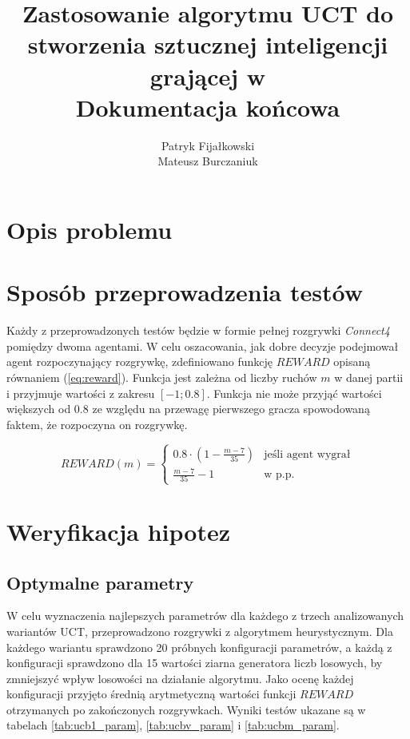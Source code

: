 \documentclass[a4paper,12pt]{article}
\title{
	Zastosowanie algorytmu UCT do stworzenia sztucznej inteligencji grającej w \nazwagry\\
	\large Dokumentacja końcowa}
\author{Patryk Fijałkowski \\ Mateusz Burczaniuk}
\let\oldsection\section
\renewcommand\section{\clearpage\oldsection}
\newcommand{\twopartdef}[3]
{
	\left\{
	\begin{array}{ll}
		#1 & \mbox{jeśli agent wygrał} #2 \\
		#3 & \mbox{w p.p. } 
	\end{array}
	\right.
}
\begin{document}
\begin{titlingpage}
	\maketitle
	\vspace{3cm}
\end{titlingpage}

\section{Opis problemu}


\section{Sposób przeprowadzenia testów}
Każdy z przeprowadzonych testów będzie w formie pełnej rozgrywki \textit{Connect4} pomiędzy dwoma agentami. W celu oszacowania, jak dobre decyzje podejmował agent rozpoczynający rozgrywkę, zdefiniowano funkcję $REWARD$ opisaną równaniem (\ref{eq:reward}). Funkcja jest zależna od liczby ruchów $m$ w danej partii i przyjmuje wartości z zakresu $[-1; 0.8]$. Funkcja nie może przyjąć wartości większych od $0.8$ ze względu na przewagę pierwszego gracza spowodowaną faktem, że rozpoczyna on rozgrywkę.

\begin{equation} \label{eq:reward}
	REWARD(m) = \twopartdef { 0.8 \cdot (1 - \frac{m-7}{35}) } {} {\frac{m-7}{35} - 1}
\end{equation}



\section{Weryfikacja hipotez}
\subsection{Optymalne parametry}
W celu wyznaczenia najlepszych parametrów dla każdego z trzech analizowanych wariantów UCT, przeprowadzono rozgrywki z algorytmem heurystycznym. Dla każdego wariantu sprawdzono 20 próbnych konfiguracji parametrów, a każdą z konfiguracji sprawdzono dla 15 wartości ziarna generatora liczb losowych, by zmniejszyć wpływ losowości na działanie algorytmu. Jako ocenę każdej konfiguracji przyjęto średnią arytmetyczną wartości funkcji $REWARD$ otrzymanych po zakończonych rozgrywkach. Wyniki testów ukazane są w tabelach \ref{tab:ucb1_param}, \ref{tab:ucbv_param} i \ref{tab:ucbm_param}.
\end{document}
